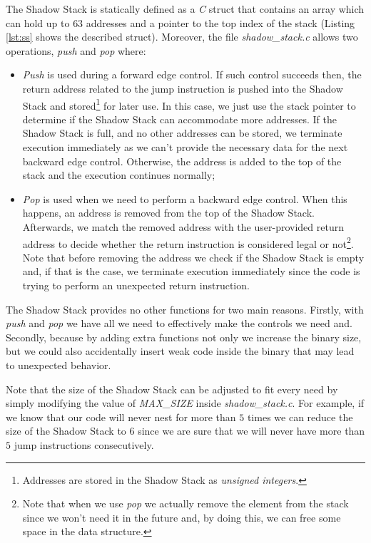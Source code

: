 The Shadow Stack is statically defined as a \textit{C} struct that contains an
array which can hold up to $63$ addresses and a pointer to the top index of the
stack (Listing \ref{lst:ss} shows the described struct). Moreover, the file
\textit{shadow\_stack.c} allows two operations, \textit{push} and \textit{pop}
where:
\begin{itemize}
  \item \textit{Push} is used during a forward edge control. If such control succeeds
    then, the return address related to the jump instruction is pushed into the
    Shadow Stack and stored\footnote{Addresses are stored in the Shadow Stack as
    \textit{unsigned integers}.} for later use. In this case, we just use the stack
    pointer to determine if the Shadow Stack can accommodate more addresses. If
    the Shadow Stack is full, and no other addresses can be stored, we terminate
    execution immediately as we can't provide the necessary data for the next
    backward edge control. Otherwise, the address is added to the top of the
    stack and the execution continues normally;

  \item \textit{Pop} is used when we need to perform a backward edge control. When
    this happens, an address is removed from the top of the Shadow Stack. Afterwards,
    we match the removed address with the user-provided return address to decide
    whether the return instruction is considered legal or not\footnote{Note that
    when we use \textit{pop} we actually remove the element from the stack since
    we won't need it in the future and, by doing this, we can free some space in
    the data structure.}. Note that before removing the address we check if the
    Shadow Stack is empty and, if that is the case, we terminate execution
    immediately since the code is trying to perform an unexpected return
    instruction.
\end{itemize}

The Shadow Stack provides no other functions for two main reasons. Firstly, with
\textit{push} and \textit{pop} we have all we need to effectively make the
controls we need and. Secondly, because by adding extra functions not only we
increase the binary size, but we could also accidentally insert weak code inside
the binary that may lead to unexpected behavior.

Note that the size of the Shadow Stack can be adjusted to fit every need by simply
modifying the value of \textit{MAX\_SIZE} inside \textit{shadow\_stack.c}. For
example, if we know that our code will never nest for more than $5$ times we can
reduce the size of the Shadow Stack to $6$ since we are sure that we will never have
more than $5$ jump instructions consecutively.

